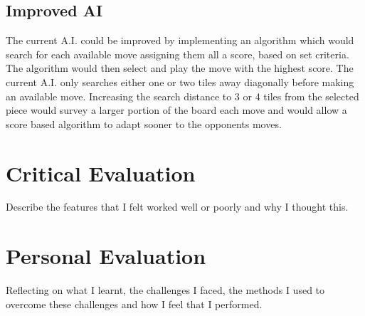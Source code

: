 \documentclass[10pt, a4paper]{article}
\begin{document}
    	
    \subsection{Improved AI}
    
   The current A.I. could be improved by implementing an algorithm which would search for each available move assigning them all a score, based on set criteria. The algorithm would then select and play the move with the highest score.    
   The current A.I. only searches either one or two tiles away diagonally before making an available move. Increasing the search distance to 3 or 4 tiles from the selected piece would survey a larger portion of the board each move and would allow a score based algorithm to adapt sooner to the opponents moves.
   
    
    
    
    
    
    
    
    
    
    
    
    
  
    
\section{Critical Evaluation}
Describe the features that I felt worked well or poorly and why I thought this.





    
\section{Personal Evaluation}  
Reflecting on what I learnt, the challenges I faced, the methods I used to overcome these challenges and how I feel that I performed.





\end{document}
